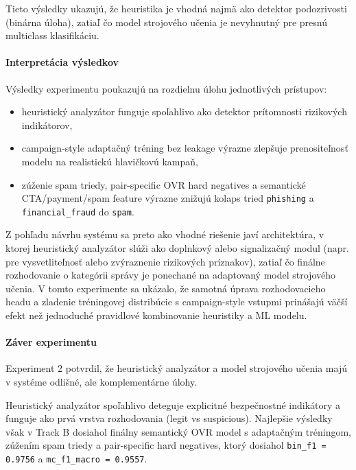 \documentclass[conference]{IEEEtran}
\begin{document}
Tieto výsledky ukazujú, že heuristika je vhodná najmä ako detektor podozrivosti (binárna úloha), zatiaľ čo model strojového učenia je nevyhnutný pre presnú multiclass klasifikáciu.

\paragraph{Interpretácia výsledkov}

Výsledky experimentu poukazujú na rozdielnu úlohu jednotlivých prístupov:

\begin{itemize}
    \item heuristický analyzátor funguje spoľahlivo ako detektor prítomnosti rizikových indikátorov,
    \item campaign-style adaptačný tréning bez leakage výrazne zlepšuje prenositeľnosť modelu na realistickú hlavičkovú kampaň,
    \item zúženie spam triedy, pair-specific OVR hard negatives a semantické CTA/payment/spam feature výrazne znižujú kolaps tried \texttt{phishing} a \texttt{financial\_fraud} do \texttt{spam}.
\end{itemize}

Z pohľadu návrhu systému sa preto ako vhodné riešenie javí architektúra, v ktorej heuristický analyzátor slúži ako doplnkový alebo signalizačný modul (napr. pre vysvetliteľnosť alebo zvýraznenie rizikových príznakov), zatiaľ čo finálne rozhodovanie o kategórii správy je ponechané na adaptovaný model strojového učenia. V tomto experimente sa ukázalo, že samotná úprava rozhodovacieho headu a zladenie tréningovej distribúcie s campaign-style vstupmi prinášajú väčší efekt než jednoduché pravidlové kombinovanie heuristiky a ML modelu.

\paragraph{Záver experimentu}

Experiment 2 potvrdil, že heuristický analyzátor a model strojového učenia majú v systéme odlišné, ale komplementárne úlohy.

Heuristický analyzátor spoľahlivo deteguje explicitné bezpečnostné indikátory a funguje ako prvá vrstva rozhodovania (legit vs suspicious). Najlepšie výsledky však v Track B dosiahol finálny semantický OVR model s adaptačným tréningom, zúžením spam triedy a pair-specific hard negatives, ktorý dosiahol \texttt{bin\_f1 = 0.9756} a \texttt{mc\_f1\_macro = 0.9557}.
\end{document}
